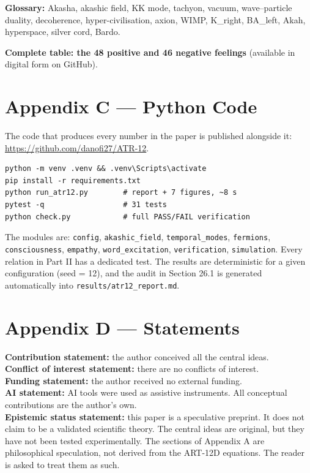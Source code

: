 \textbf{Glossary:} Akasha, akashic field, KK mode, tachyon, vacuum, wave--particle duality, decoherence, hyper-civilisation, axion, WIMP, K\_right, BA\_left, Akah, hyperspace, silver cord, Bardo.

\textbf{Complete table: the 48 positive and 46 negative feelings} (available in digital form on GitHub).

\section{Appendix C --- Python Code}
The code that produces every number in the paper is published alongside it: \url{https://github.com/danofi27/ATR-12}.

\begin{verbatim}
python -m venv .venv && .venv\Scripts\activate
pip install -r requirements.txt
python run_atr12.py        # report + 7 figures, ~8 s
pytest -q                  # 31 tests
python check.py            # full PASS/FAIL verification
\end{verbatim}

The modules are: \texttt{config}, \texttt{akashic\_field}, \texttt{temporal\_modes}, \texttt{fermions}, \texttt{consciousness}, \texttt{empathy}, \texttt{word\_excitation}, \texttt{verification}, \texttt{simulation}. Every relation in Part II has a dedicated test. The results are deterministic for a given configuration (seed = 12), and the audit in Section 26.1 is generated automatically into \texttt{results/atr12\_report.md}.

\section{Appendix D --- Statements}
\textbf{Contribution statement:} the author conceived all the central ideas. \\
\textbf{Conflict of interest statement:} there are no conflicts of interest. \\
\textbf{Funding statement:} the author received no external funding. \\
\textbf{AI statement:} AI tools were used as assistive instruments. All conceptual contributions are the author's own. \\
\textbf{Epistemic status statement:} this paper is a speculative preprint. It does not claim to be a validated scientific theory. The central ideas are original, but they have not been tested experimentally. The sections of Appendix A are philosophical speculation, not derived from the ART-12D equations. The reader is asked to treat them as such.

